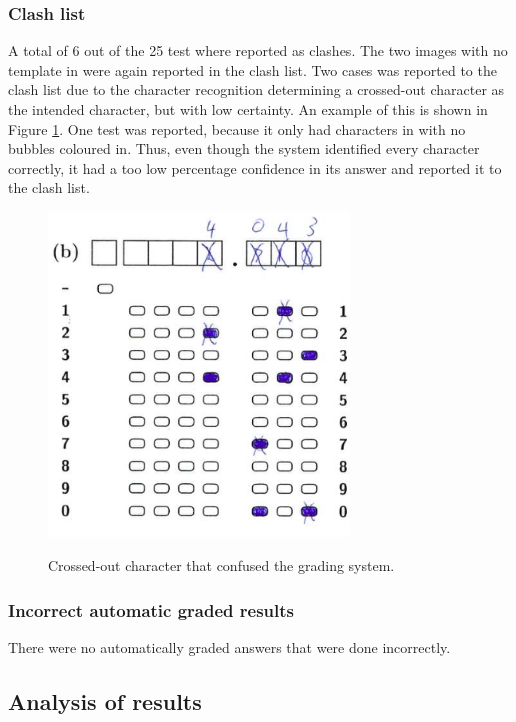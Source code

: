 \subsubsection{Clash list}

A total of 6 out of the 25 test where reported as clashes. The two images with no template in were again reported in the clash list. Two cases was reported to the clash list due to the character recognition determining a crossed-out character as the intended character, but with low certainty. An example of this is shown in Figure \ref{fig:crossedOutCharacter}. One test was reported, because it only had characters in with no bubbles coloured in. Thus, even though the system identified every character correctly, it had a too low percentage confidence in its answer and reported it to the clash list. 

\begin{figure}
  \centering
  \includegraphics[width=8cm]{crossedOutCharacter}\\
  \caption{Crossed-out character that confused the grading system.}
  \label{fig:crossedOutCharacter}
\end{figure}

\subsubsection{Incorrect automatic graded results}

There were no automatically graded answers that were done incorrectly.

\subsection{Analysis of results}


